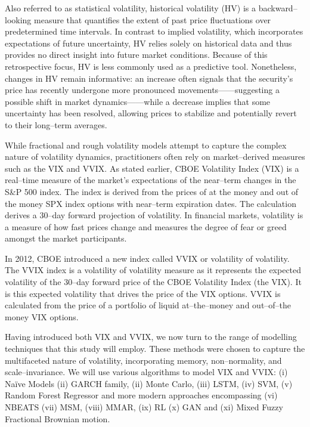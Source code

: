 \documentclass[12pt,a4paper]{report}
\numberwithin{equation}{section}
\begin{document}
Also referred to as statistical volatility, historical volatility (HV)
is a backward--looking measure that quantifies the extent of past price
fluctuations over predetermined time intervals. In contrast to implied
volatility, which incorporates expectations of future uncertainty, HV
relies solely on historical data and thus provides no direct insight
into future market conditions. Because of this retrospective focus, HV
is less commonly used as a predictive tool. Nonetheless, changes in HV
remain informative: an increase often signals that the security's price
has recently undergone more pronounced movements------suggesting a possible
shift in market dynamics------while a decrease implies that some
uncertainty has been resolved, allowing prices to stabilize and
potentially revert to their long--term averages.

While fractional and rough volatility models attempt to capture the
complex nature of volatility dynamics, practitioners often rely on
market--derived measures such as the VIX and VVIX. As stated earlier,
CBOE Volatility Index (VIX) is a real--time measure of the market's
expectations of the near--term changes in the S\&P 500 index. The index
is derived from the prices of at the money and out of the money SPX
index options with near--term expiration dates. The calculation derives a
30--day forward projection of volatility. In financial markets,
volatility is a measure of how fast prices change and measures the
degree of fear or greed amongst the market participants.

In 2012, CBOE introduced a new index called VVIX or volatility of
volatility. The VVIX index is a volatility of volatility measure as it
represents the expected volatility of the 30--day forward price of the
CBOE Volatility Index (the VIX). It is this expected volatility that
drives the price of the VIX options. VVIX is calculated from the price
of a portfolio of liquid at--the--money and out--of--the money VIX options.

Having introduced both VIX and VVIX, we now turn to the range of
modelling techniques that this study will employ. These methods were
chosen to capture the multifaceted nature of volatility, incorporating
memory, non--normality, and scale--invariance. We will use various
algorithms to model VIX and VVIX: (i) Naïve Models (ii) GARCH family,
(ii) Monte Carlo, (iii) LSTM, (iv) SVM, (v) Random Forest Regressor and
more modern approaches encompassing (vi) NBEATS (vii) MSM, (viii) MMAR,
(ix) RL (x) GAN and (xi) Mixed Fuzzy Fractional Brownian motion.
\end{document}
